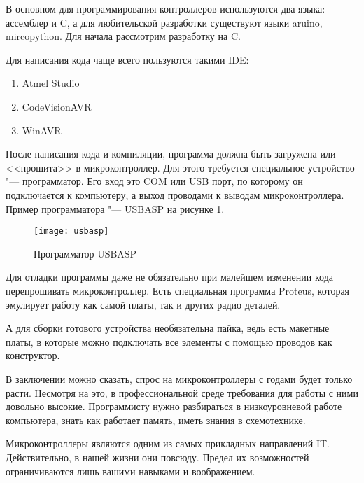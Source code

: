 \documentclass[14pt,a4paper]{extarticle}
\begin{document}
	В основном для программирования контроллеров используются два языка: ассемблер и C, а для любительской разработки существуют языки aruino, mircopython. Для начала рассмотрим разработку на C.
	
	Для написания кода чаще всего пользуются такими IDE:
	
	\begin{enumerate}
		\item Atmel Studio
		\item CodeVisionAVR
		\item WinAVR
	\end{enumerate}
	
	После написания кода и компиляции, программа должна быть загружена или <<прошита>> в микроконтроллер. Для этого требуется специальное устройство "--- программатор. Его вход это COM или USB порт, по которому он подключается к компьютеру, а выход проводами к выводам микроконтроллера. Пример программатора "--- USBASP на рисунке \ref{usbasp}.
	
	\begin{figure}[H]
		\centering
		\texttt{[image: usbasp]}
		\caption[]{Программатор USBASP}
		\label{usbasp}
	\end{figure}
	
	Для отладки программы даже не обязательно при малейшем изменении кода перепрошивать микроконтроллер. Есть специальная программа Proteus, которая эмулирует работу как самой платы, так и других радио деталей.
	
	А для сборки готового устройства необязательна пайка, ведь есть макетные платы, в которые можно подключать все элементы с помощью проводов как конструктор.
	
	
В заключении можно сказать, спрос на микроконтроллеры с годами будет только расти. Несмотря на это, в профессиональной среде требования для работы с ними довольно высокие. Программисту нужно разбираться в низкоуровневой работе компьютера, знать как работает память, иметь знания в схемотехнике.

Микроконтроллеры являются одним из самых прикладных направлений IT. Действительно, в нашей жизни они повсюду. Предел их возможностей ограничиваются лишь вашими навыками и воображением.
 
\end{document}
